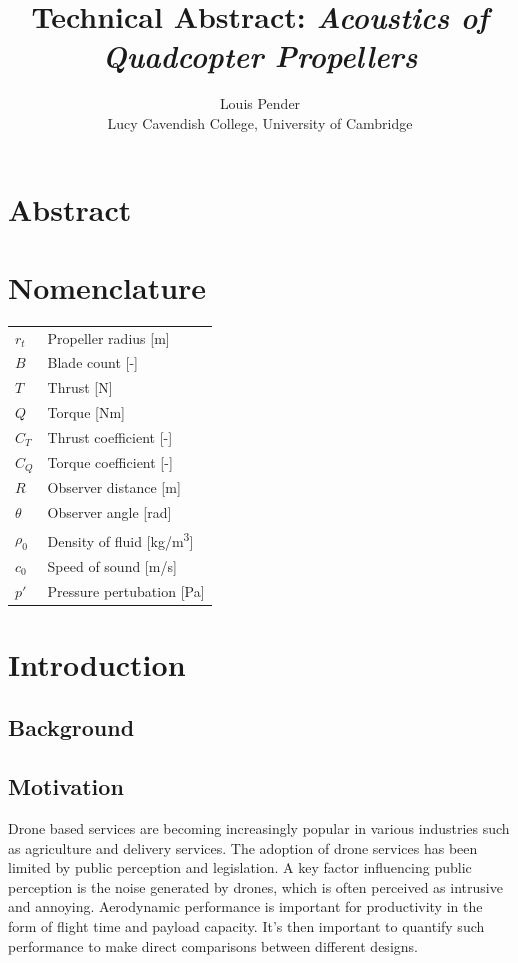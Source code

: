 \documentclass[12pt,a4paper]{article}
\title{\vspace{-2cm}Technical Abstract: \textit{Acoustics of Quadcopter Propellers}}
\author{Louis Pender \\
        Lucy Cavendish College, University of Cambridge}
\date{\vspace{-5mm}}
\begin{document}
\maketitle

\thispagestyle{empty} %

\section*{Abstract}

\newpage
\tableofcontents

\section*{Nomenclature}
\begin{tabular}{ll}
    $r_t$        & Propeller radius [m] \\
    $B$        & Blade count [-] \\
    $T$        & Thrust [N] \\
    $Q$        & Torque [Nm] \\
    $C_T$      & Thrust coefficient [-] \\
    $C_Q$      & Torque coefficient [-] \\
    $R$        & Observer distance [m] \\
    $\theta$   & Observer angle [rad] \\
    $\rho_0$     & Density of fluid [kg/m\textsuperscript{3}] \\
    $c_0$   & Speed of sound [m/s] \\
    $p'$      & Pressure pertubation [Pa] \\
\end{tabular}

\newpage
\section{Introduction}

\subsection{Background}

\subsection{Motivation}

Drone based services are becoming increasingly popular in various industries such as agriculture and delivery services.
The adoption of drone services has been limited by public perception and legislation.
A key factor influencing public perception is the noise generated by drones, which is often perceived as intrusive and annoying.
Aerodynamic performance is important for productivity in the form of flight time and payload capacity.
It's then important to quantify such performance to make direct comparisons between different designs.
\end{document}
